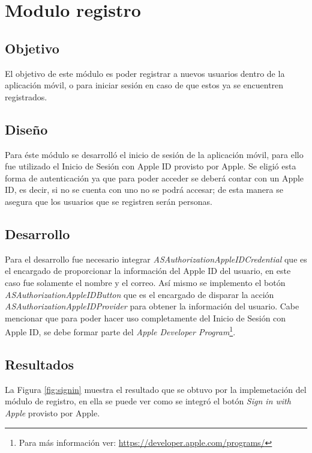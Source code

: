 \section{Modulo registro}

\subsection{Objetivo}
El objetivo de este módulo es poder registrar a nuevos usuarios dentro de la aplicación móvil, o para iniciar sesión en caso de que estos ya se encuentren registrados.

\subsection{Diseño}

Para éste módulo se desarrolló el inicio de sesión de la aplicación móvil, para ello fue utilizado el Inicio de Sesión con Apple ID provisto por Apple. Se eligió esta forma de autenticación ya que para poder acceder se deberá contar con un Apple ID, es decir, si no se cuenta con uno no se podrá accesar; de esta manera se asegura que los usuarios que se registren serán personas.

\subsection{Desarrollo}

Para el desarrollo fue necesario integrar \textit{ASAuthorizationAppleIDCredential} que es el encargado de proporcionar la información del Apple ID del usuario, en este caso fue solamente el nombre y el correo. Así mismo se implemento el botón \textit{ASAuthorizationAppleIDButton} que es el encargado de disparar la acción \textit{ASAuthorizationAppleIDProvider} para obtener la información del usuario. Cabe mencionar que para poder hacer uso completamente del Inicio de Sesión con Apple ID, se debe formar parte del \textit{Apple Developer Program}\footnote{Para más información ver: \url{https://developer.apple.com/programs/}}.


\subsection{Resultados}

La Figura \ref{fig:signin} muestra el resultado que se obtuvo por la implemetación del módulo de registro, en ella se puede ver como se integró el botón \textit{Sign in with Apple} provisto por Apple. \\

